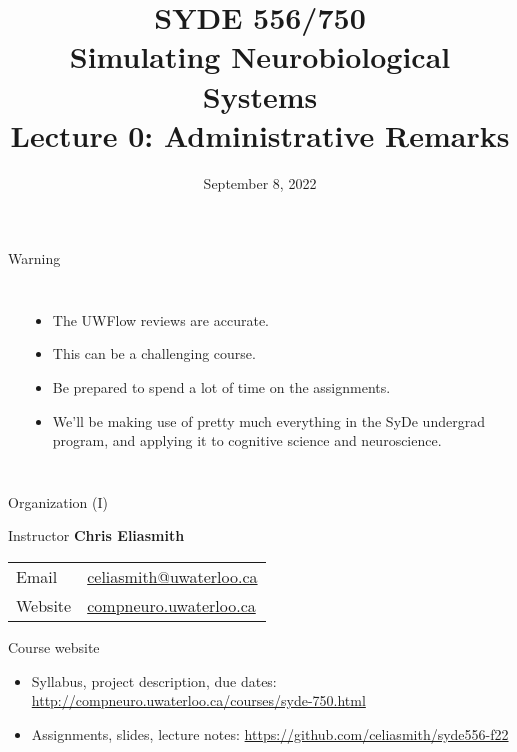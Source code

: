 \documentclass[aspectratio=169]{beamer}
\date{September 8, 2022}
\title{SYDE 556/750 \\ Simulating Neurobiological Systems \\ Lecture 0: Administrative Remarks}
\begin{document}
	
\begin{frame}{}
	\MakeTitle
\end{frame}

\begin{frame}{Warning}
	\begin{columns}[T]
		\fboxrule=0.4pt\fboxsep=0pt\\
		\begin{itemize}
			\item The UWFlow reviews are accurate. 
			\item This can be a challenging course.
			\item Be prepared to spend a lot of time on the assignments.
			\item We'll be making use of pretty much everything in the SyDe undergrad
			      program, and applying it to cognitive science and neuroscience.
		\end{itemize}
	\end{columns}
\end{frame}

\begin{frame}{Organization (I)}
	\begin{block}{Instructor}
		\vspace{2mm}
		\textbf{Chris Eliasmith}\\[2mm]
		\hspace{-2.5mm}\begin{tabular}{l l}
			Email & \url{celiasmith@uwaterloo.ca}\\
			Website & \url{compneuro.uwaterloo.ca}\\
		\end{tabular}
	\end{block}
 
	\vfill

	\begin{block}{Course website}
		\begin{itemize}
      \item Syllabus, project description, due dates: \url{http://compneuro.uwaterloo.ca/courses/syde-750.html}
			\item Assignments, slides, lecture notes: \url{https://github.com/celiasmith/syde556-f22}
		\end{itemize}
	\end{block}
\end{frame}
\end{document}
